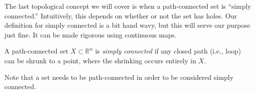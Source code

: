 \documentclass{ximera}
\begin{document}
The last topological concept we will cover is when a path-connected set is ``simply connected.'' Intuitively, this depends on whether or not the set has holes. Our definition for simply connected is a bit hand wavy, but this will serve our purpose just fine. It can be made rigorous using continuous maps. %

\begin{definition}
A path-connected set $X\subset\mathbb{R}^n$ is \emph{simply connected} if any closed path (i.e., loop) can be shrunk to a point, where the shrinking occurs entirely in $X$.
\end{definition}


Note that a set needs to be path-connected in order to be considered simply connected.
\end{document}
